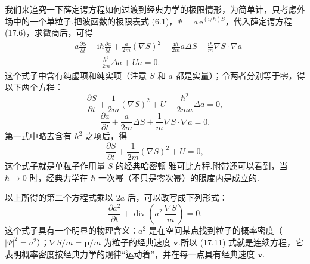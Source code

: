 我们来追究一下薛定谔方程如何过渡到经典力学的极限情形，为简单计，只考虑外场中的一个单粒子.把波函数的极限表式 (6.1)，$\varPsi=a\,\mathrm{e}^{(\mathrm{i}/\hbar)S}$，代入薛定谔方程 (17.6)，求微商后，可得
\begin{equation*}
\begin{aligned}
  &a\frac{\partial S}{\partial t}-\mathrm{i}\hbar\frac{\partial a}{\partial t}
  +\frac{a}{2m}\left(\nabla S\right)^2-\frac{\mathrm{i}\hbar}{2m}a\Delta S
  -\frac{\mathrm{i}\hbar}{m}\nabla S\cdot\nabla a\\
  &\qquad-\frac{\hbar^2}{2m}\Delta a+Ua=0.
\end{aligned}
\end{equation*}
这个式子中含有纯虚项和纯实项（注意 $S$ 和 $a$ 都是实量）；令两者分别等于零，得以下两个方程：
\begin{equation*}
  \frac{\partial S}{\partial t}
  +\frac{1}{2m}\left(\nabla S\right)^2
  +U-\frac{\hbar^2}{2ma}\Delta a=0,
\end{equation*}
\begin{equation*}
  \frac{\partial a}{\partial t}
  +\frac{a}{2m}\Delta S
  +\frac{1}{m}\nabla S\cdot\nabla a=0.
\end{equation*}
第一式中略去含有 $\hbar^2$ 之项后，得
\begin{equation}
  \frac{\partial S}{\partial t}
  +\frac{1}{2m}\left(\nabla S\right)^2+U=0,
\end{equation}
这个式子就是单粒子作用量 $S$ 的经典哈密顿-雅可比方程.附带还可以看到，当 $\hbar\to 0$ 时，经典力学在 $\hbar$ 一次幂（不只是零次幂）的限度内是成立的.

以上所得的第二个方程式乘以 $2a$ 后，可以改写成下列形式：
\begin{equation}
  \frac{\partial a^2}{\partial t}
  +\operatorname{div}\left(a^2\,\frac{\nabla S}{m}\right)=0.
\end{equation}
这个式子具有一个明显的物理含义：$a^2$ 是在空间某点找到粒子的概率密度（$|\varPsi|^2=a^2$）；$\nabla S/m=\boldsymbol{p}/m$ 为粒子的经典速度 $\boldsymbol{v}$.所以 (17.11) 式就是连续方程，它表明概率密度按经典力学的规律“运动着”，并在每一点具有经典速度 $\boldsymbol{v}$.

